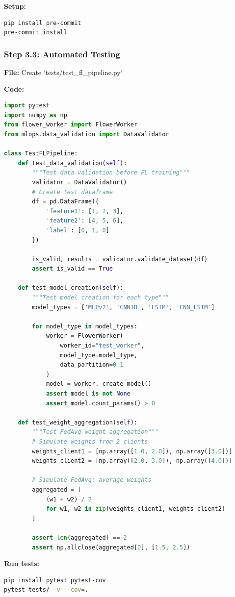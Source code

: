 \documentclass[12pt]{article}
\begin{document}
\textbf{Setup:}
\begin{lstlisting}[language=bash]
pip install pre-commit
pre-commit install
\end{lstlisting}

\subsubsection{Step 3.3: Automated Testing}

\textbf{File:} Create `tests/test_fl_pipeline.py`

\textbf{Code:}
\begin{lstlisting}[language=Python]
import pytest
import numpy as np
from flower_worker import FlowerWorker
from mlops.data_validation import DataValidator

class TestFLPipeline:
    def test_data_validation(self):
        """Test data validation before FL training"""
        validator = DataValidator()
        # Create test dataframe
        df = pd.DataFrame({
            'feature1': [1, 2, 3],
            'feature2': [4, 5, 6],
            'label': [0, 1, 0]
        })
        
        is_valid, results = validator.validate_dataset(df)
        assert is_valid == True
    
    def test_model_creation(self):
        """Test model creation for each type"""
        model_types = ['MLPv2', 'CNN1D', 'LSTM', 'CNN_LSTM']
        
        for model_type in model_types:
            worker = FlowerWorker(
                worker_id="test_worker",
                model_type=model_type,
                data_partition=0.1
            )
            model = worker._create_model()
            assert model is not None
            assert model.count_params() > 0
    
    def test_weight_aggregation(self):
        """Test FedAvg weight aggregation"""
        # Simulate weights from 2 clients
        weights_client1 = [np.array([1.0, 2.0]), np.array([3.0])]
        weights_client2 = [np.array([2.0, 3.0]), np.array([4.0])]
        
        # Simulate FedAvg: average weights
        aggregated = [
            (w1 + w2) / 2 
            for w1, w2 in zip(weights_client1, weights_client2)
        ]
        
        assert len(aggregated) == 2
        assert np.allclose(aggregated[0], [1.5, 2.5])
\end{lstlisting}

\textbf{Run tests:}
\begin{lstlisting}[language=bash]
pip install pytest pytest-cov
pytest tests/ -v --cov=.
\end{lstlisting}
\end{document}
